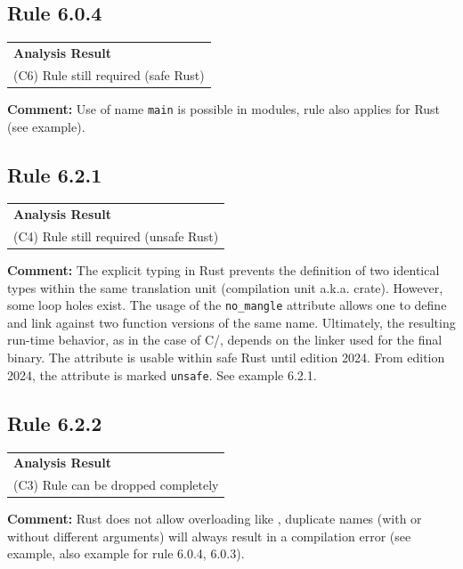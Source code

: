 \subsection*{Rule 6.0.4}
\begin{longtable}{p{13cm}}
\textbf{Analysis Result} \\
(C6) Rule still required (safe Rust) \\
\end{longtable}
\textbf{Comment:} Use of name \texttt{main} is possible in modules, rule also applies for Rust (see example). \\


\subsection*{Rule 6.2.1}
\begin{longtable}{p{13cm}}
\textbf{Analysis Result} \\
(C4) Rule still required (unsafe Rust) \\
\end{longtable}
\textbf{Comment:} The explicit typing in Rust prevents the definition of two identical types within the same translation unit (compilation unit a.k.a. crate). However, some loop holes exist. The usage of the \texttt{no\_mangle} attribute allows one to define and link against two function versions of the same name. Ultimately, the resulting run-time behavior, as in the case of C/\Cpp, depends on the linker used for the final binary. The attribute is usable within safe Rust until edition 2024. From edition 2024, the attribute is marked \texttt{unsafe}. See example 6.2.1. \\
\subsection*{Rule 6.2.2}
\begin{longtable}{p{13cm}}
\textbf{Analysis Result} \\
(C3) Rule can be dropped completely \\
\end{longtable}
\textbf{Comment:} Rust does not allow overloading like \Cpp, duplicate names (with or without different arguments) will always result in a compilation error (see example, also example for rule 6.0.4, 6.0.3). \\


